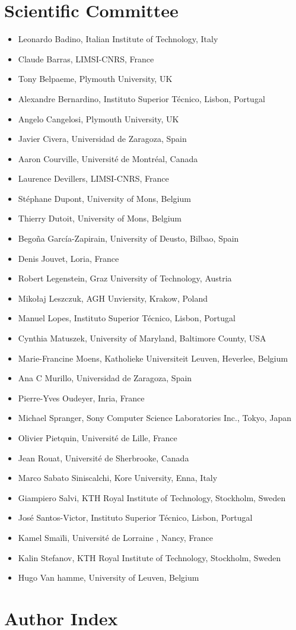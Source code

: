 \documentclass{confproc}
\begin{document}
\section*{Scientific Committee}
\begin{itemize}
\item Leonardo Badino, Italian Institute of Technology, Italy
\item Claude Barras, LIMSI-CNRS, France
\item Tony Belpaeme, Plymouth University, UK
\item Alexandre Bernardino, Instituto Superior Técnico, Lisbon, Portugal
\item Angelo Cangelosi, Plymouth University, UK
\item Javier Civera, Universidad de Zaragoza, Spain
\item Aaron Courville, Université de Montréal, Canada
\item Laurence Devillers, LIMSI-CNRS, France
\item Stéphane Dupont, University of Mons, Belgium
\item Thierry Dutoit, University of Mons, Belgium
\item Begoña García-Zapirain, University of Deusto, Bilbao, Spain
\item Denis Jouvet, Loria, France
\item Robert Legenstein, Graz University of Technology, Austria
\item Mikołaj Leszczuk, AGH Unviersity, Krakow, Poland
\item Manuel Lopes, Instituto Superior Técnico, Lisbon, Portugal
\item Cynthia Matuszek, University of Maryland, Baltimore County, USA
\item Marie-Francine Moens, Katholieke Universiteit Leuven, Heverlee, Belgium
\item Ana C Murillo, Universidad de Zaragoza, Spain
\item Pierre-Yves Oudeyer, Inria, France
\item Michael Spranger, Sony Computer Science Laboratories Inc., Tokyo, Japan
\item Olivier Pietquin, Université de Lille, France
\item Jean Rouat, Université de Sherbrooke, Canada
\item Marco Sabato Siniscalchi, Kore University, Enna, Italy
\item Giampiero Salvi, KTH Royal Institute of Technology, Stockholm, Sweden
\item José Santos-Victor, Instituto Superior Técnico, Lisbon, Portugal
\item Kamel Smaïli, Université de Lorraine , Nancy, France
\item Kalin Stefanov, KTH Royal Institute of Technology, Stockholm, Sweden
\item Hugo Van hamme, University of Leuven, Belgium
\end{itemize}
\newpage
\tableofcontents



\section*{Author Index}
\begin{multicols}{2}
\printauthorindex
\end{multicols}
\end{document}
